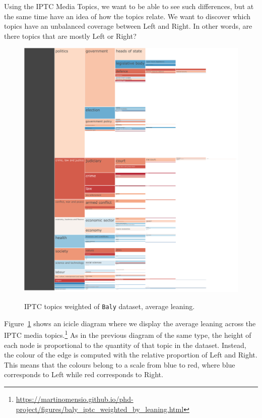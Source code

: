 Using the IPTC Media Topics, we want to be able to see such differences, but at the same time have an idea of how the topics relate.
%
We want to discover which topics have an unbalanced coverage between Left and Right. In other words, are there topics that are mostly Left or Right?


\begin{figure}[!htbp]
    \centering
    \href{https://martinomensio.github.io/phd-project/figures/baly_iptc_weighted_by_leaning.html}{\includegraphics[trim={2.65cm 0cm 0cm 0cm},clip,width=\linewidth]{figures/baly_iptc_weighted_by_leaning.pdf}}
    \caption{IPTC topics weighted of \texttt{Baly} dataset, average leaning.}
    \label{fig:baly_iptc_weighted_by_leaning}
\end{figure}

Figure~\ref{fig:baly_iptc_weighted_by_leaning}
shows an icicle diagram where we display the average leaning across the IPTC media topics.\footnote{\url{https://martinomensio.github.io/phd-project/figures/baly_iptc_weighted_by_leaning.html}}
As in the previous diagram of the same type, the height of each node is proportional to the quantity of that topic in the dataset.
Instead, the colour of the edge is computed with the relative proportion of Left and Right. This means that the colours belong to a scale from blue to red, where blue corresponds to Left while red corresponds to Right.

